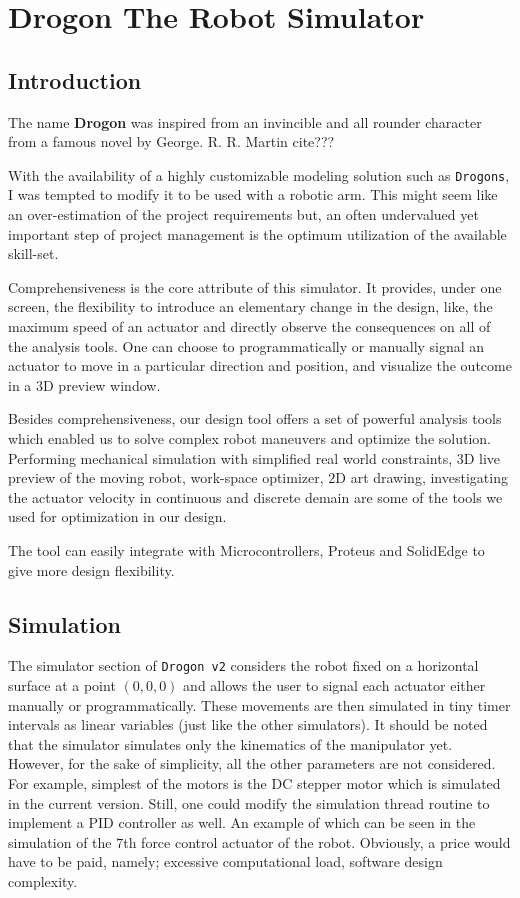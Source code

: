 \section{Drogon The Robot Simulator}
{
    \subsection{Introduction}
    The name \textbf{Drogon} was inspired from an invincible and all rounder character from a famous novel by George. R. R. Martin cite???

    With the availability of a highly customizable modeling solution such as \texttt{Drogons}, I was tempted to modify it to be used with a robotic arm. This might seem like an over-estimation of the project requirements but, an often undervalued yet important step of project management is the optimum utilization of the available skill-set.

    Comprehensiveness is the core attribute of this simulator. It provides, under one screen, the flexibility to introduce an elementary change in the design, like, the maximum speed of an actuator and directly observe the consequences on all of the analysis tools. One can choose to programmatically or manually signal an actuator to move in a particular direction and position, and visualize the outcome in a $3$D preview window.

    Besides comprehensiveness, our design tool offers a set of powerful analysis tools which enabled us to solve complex robot maneuvers and optimize the solution. Performing mechanical simulation with simplified real world constraints, $3$D live preview of the moving robot, work-space optimizer, $2$D art drawing, investigating the actuator velocity in continuous and discrete demain are some of the tools we used for optimization in our design.

    The tool can easily integrate with Microcontrollers, Proteus and SolidEdge to give more design flexibility.
    \subsection{Simulation}
    The simulator section of \texttt{Drogon v2} considers the robot fixed on a horizontal surface at a point $(0, 0, 0)$ and allows the user to signal each actuator either manually or programmatically. These movements are then simulated in tiny timer intervals as linear variables (just like the other simulators). It should be noted that the simulator simulates only the kinematics of the manipulator yet. However, for the sake of simplicity, all the other parameters are not considered. For example, simplest of the motors is the DC stepper motor which is simulated in the current version. Still, one could modify the simulation thread routine to implement a PID controller as well. An example of which can be seen in the simulation of the $7$th force control actuator of the robot. Obviously, a price would have to be paid, namely; excessive computational load, software design complexity.

}
